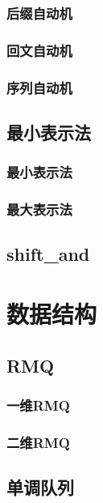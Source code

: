 ﻿\documentclass[a4paper,twocolumn]{article}
\begin{document}
\subsubsection{后缀自动机}

\subsubsection{回文自动机}

\subsubsection{序列自动机}

\subsection{最小表示法}
\subsubsection{最小表示法}

\subsubsection{最大表示法}

\subsection{shift\_and}

\section{数据结构}
\subsection{RMQ}
\subsubsection{一维RMQ}

\subsubsection{二维RMQ}

\subsection{单调队列}

\end{document}
